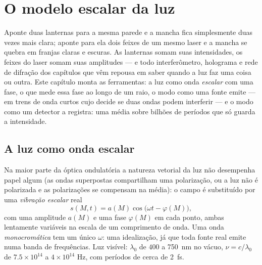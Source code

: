 \chapter{O modelo escalar da luz}\label{ch:b2:scalar-light-model}

Aponte duas lanternas para a mesma parede e a mancha fica simplesmente
duas vezes mais clara; aponte para ela dois feixes de um mesmo laser e a mancha se quebra em
franjas claras e escuras. As lanternas somam suas intensidades, os feixes do laser
somam suas amplitudes --- e todo interferômetro, holograma e
rede de difração dos capítulos que vêm repousa em saber quando a luz
faz uma coisa ou outra. Este capítulo monta as ferramentas: a luz como onda
\emph{escalar} com uma fase, o \emph{} que mede essa fase
ao longo de um raio, o modo como uma fonte emite --- em trens de onda curtos cujo
\emph{} decide se duas ondas podem interferir --- e
o modo como um detector a registra: uma média sobre bilhões de períodos
que só guarda a intensidade.

\section{A luz como onda escalar}

\begin{definition}\label{def:b2:scalar-light-model:scalar}
Na maior parte da óptica ondulatória a natureza vetorial da luz não desempenha papel algum (as
ondas superpostas compartilham uma polarização, ou a luz não é polarizada
e as polarizações se compensam na média): o campo é substituído por uma
\emph{vibração escalar} real
\[
s(M, t) = a(M)\cos\bigl(\omega t - \varphi(M)\bigr) ,
\]
com uma amplitude $a(M)$ e uma fase $\varphi(M)$ em cada ponto, ambas
lentamente variáveis na escala de um comprimento de onda. Uma onda \emph{monocromática}
tem um único $\omega$: uma idealização, já que toda fonte real emite
numa banda de frequências. Luz visível: $\lambda_0$ de $400$ a
\qty{750}{nm} no vácuo, $\nu = c/\lambda_0$ de $7.5 \times 10^{14}$ a $4 \times 10^{14}$ Hz,
com períodos de cerca de \qty{2}{fs}.
\end{definition}

